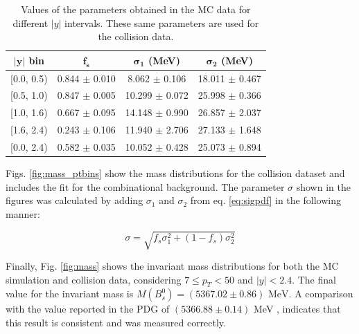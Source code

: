 \begin{table}[htp!]
	
	\begin{center}
		\begin{tabular}{|c|c|c|c|}
			\hline
			\textbf{$\mathbf{|y|}$ bin} & $\mathbf{f_s}$ & \textbf{$\mathbf{\sigma_1}$ (MeV)} & \textbf{$\mathbf{\sigma_2}$ (MeV)}\\ \hline
			[0.0, 0.5) & 0.844 $\pm$ 0.010 & 8.062 $\pm$ 0.106 &18.011 $\pm$ 0.467\\ \hline 
			[0.5, 1.0) & 0.847 $\pm$ 0.005 & 10.299 $\pm$ 0.072 &25.998 $\pm$ 0.366\\ \hline 
			[1.0, 1.6) & 0.667 $\pm$ 0.095 & 14.148 $\pm$ 0.990 &26.857 $\pm$ 2.037\\ \hline 
			[1.6, 2.4) & 0.243 $\pm$ 0.106 & 11.940 $\pm$ 2.706 &27.133 $\pm$ 1.648\\ \hline 
			[0.0, 2.4) & 0.582 $\pm$ 0.035 & 10.052 $\pm$ 0.428 &25.073 $\pm$ 0.894\\ \hline 			
		\end{tabular}
	\end{center}
	\caption{Values of the parameters obtained in the MC data for different $|y|$ intervals. These same parameters are used for the collision data.}
	\label{table:mc_ybins}
\end{table}

Figs. \ref{fig:mass_ptbins} show the mass distributions for the collision dataset and includes the fit for the combinational background. The parameter $\sigma$ shown in the figures was calculated by adding $\sigma_1$ and $\sigma_2$ from eq. \ref{eq:sigpdf} in the following manner:

\begin{equation}
	\sigma = \sqrt{f_s \sigma_1^2 + (1-f_s)\sigma_2^2}
\end{equation}


Finally, Fig. \ref{fig:mass} shows the invariant mass distributions for both the MC simulation and collision data, considering $ 7 \leq p_T < 50$ and $|y| < 2.4$. The final value for the invariant mass is $M(B^0_s) = (5367.02 \pm 0.86) \text{ MeV}$. A comparison with the value reported in the PDG of $(5366.88 \pm 0.14)$ MeV \cite{pdgstrange}, indicates that this result is consistent and was measured correctly.

